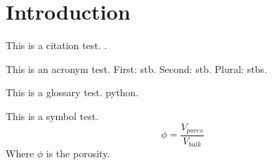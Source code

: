 
\section{Introduction} %
\label{sec:introduction}
This is a citation test. \cite{Peaceman1978Interpretation}.

This is an acronym test. First: \gls{stb}. Second: \gls{stb}. Plural: \glspl{stb}.

This is a glossary test. \gls{python}.

This is a symbol test.
\begin{equation}
    \phi = \frac{V_{pores}}{V_{bulk}}
\end{equation}
Where  $\phi$ is the porosity.
